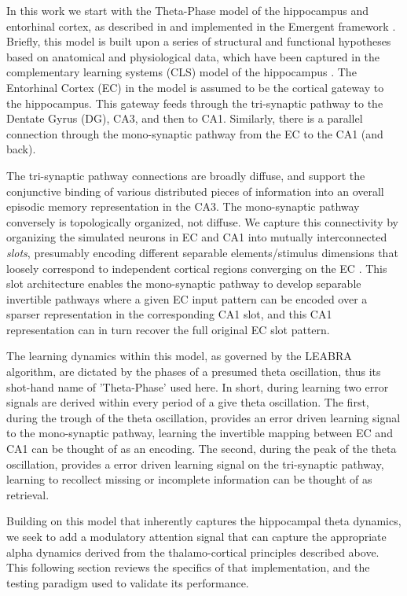 \documentclass[11pt, titlepage, twoside]{article}
\begin{document}
In this work we start with the Theta-Phase model of the hippocampus and entorhinal cortex, as described in \textcite{KetzMorkondaOReilly13} and implemented in the Emergent framework \cite{AisaMingusOReilly08}.  Briefly, this model is built upon a series of structural and functional hypotheses based on anatomical and physiological data, which have been captured in the complementary learning systems (CLS) model of the hippocampus \cite{McClellandMcNaughtonOReilly95, NormanOReilly03}. The Entorhinal Cortex (EC) in the model is assumed to be the cortical gateway to the hippocampus.  This gateway feeds through the tri-synaptic pathway to the Dentate Gyrus (DG), CA3, and then to CA1.  Similarly, there is a parallel connection through the mono-synaptic pathway from the EC to the CA1 (and back).

The tri-synaptic pathway connections are broadly diffuse, and support the conjunctive binding of various distributed pieces of information into an overall episodic memory representation in the CA3. The mono-synaptic pathway conversely is topologically organized, not diffuse.  We capture this connectivity by organizing the simulated neurons in EC and CA1 into mutually interconnected {\em slots}, presumably encoding different separable elements/stimulus dimensions that loosely correspond to independent cortical regions converging on the EC \cite{Witter10}.  This slot architecture enables the mono-synaptic pathway to develop separable invertible pathways where a given EC input pattern can be encoded over a sparser representation in the corresponding CA1 slot, and this CA1 representation can in turn recover the full original EC slot pattern. 

The learning dynamics within this model, as governed by the LEABRA algorithm, are dictated by the phases of a presumed theta oscillation, thus its shot-hand name of 'Theta-Phase' used here. In short, during learning two error signals are derived within every period of a give theta oscillation.  The first, during the trough of the theta oscillation, provides an error driven learning signal to the mono-synaptic pathway, learning the invertible mapping between EC and CA1 can be thought of as an encoding.  The second, during the peak of the theta oscillation, provides a error driven learning signal on the tri-synaptic pathway, learning to recollect missing or incomplete information can be thought of as retrieval.  

Building on this model that inherently captures the hippocampal theta dynamics, we seek to add a modulatory attention signal that can capture the appropriate alpha dynamics derived from the thalamo-cortical principles described above.  This following section reviews the specifics of that implementation, and the testing paradigm used to validate its performance.
\end{document}
